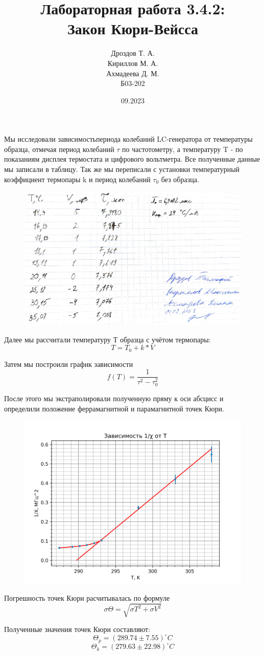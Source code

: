 \documentclass[a4paper,12pt]{article}
\title{Лабораторная работа 3.4.2: \\Закон Кюри-Вейсса}
\author{Дроздов Т. А.\\ Кириллов М. А.\\ Ахмадеева Д. М. \\Б03-202}
\date{09.2023}
\begin{document}
 

\maketitle

Мы исследовали зависимостьпериода колебаний LC-генератора от температуры образца, отмечая период колебаний $\tau$ по частотометру, а температуру T - по показаниям дисплея термостата и цифрового вольтметра. Все полученные данные мы записали в таблицу. Так же мы переписали с установки температурный коэффициент термопары k и период колебаний $\tau_0$ без образца.



\begin{figure}[h]
	\centering 
	\includegraphics[width=0.8\linewidth]{data.jpg}
\end{figure}

\FloatBarrier

Далее мы рассчитали температуру Т образца с учётом термопары: \[T = T_0 + k * V\]


Затем мы построили график зависимости \[f(T) = \frac{1}{\tau^2 - \tau_0^2}\]

После этого мы экстраполировали полученную пряму к оси абсцисс и определили положение феррамагнитной и парамагнитной точек Кюри.

\FloatBarrier

\begin{figure}[h]
	\centering 
	\includegraphics[width=0.8\linewidth]{graph.png}
\end{figure}

\FloatBarrier

Погрешность точек Кюри расчитывалась по формуле \[\sigma \Theta = \sqrt{\sigma T^2 + \sigma V^2}\]

Полученные значения точек Кюри составляют: \[\Theta_p = (289.74 \pm 7.55) ^\circ C\] \[\Theta_k = (279.63 \pm 22.98) ^\circ C\]
\end{document}
